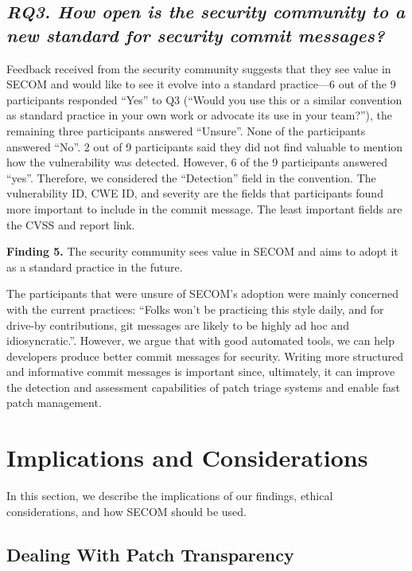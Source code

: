 \subsection*{\textit{RQ3. How open is the security community to a new standard for security commit messages?}}

Feedback received from the security community suggests that they see value in SECOM and would like to see it evolve into a standard practice---6 out of the 9 participants responded ``Yes''
to Q3 (``Would you use this or a similar convention
as standard practice in your own work or advocate its use in your team?''), the remaining three participants answered ``Unsure''. None of the participants answered ``No''. 2 out of 9 participants said they did not find valuable to mention how the vulnerability was detected. However, 6 of the 9 participants answered ``yes''. Therefore, we considered the ``Detection'' field in the convention. The vulnerability ID, CWE ID,  and severity are the fields that participants found more important to include 
in the commit message. The least important fields are the CVSS and report link.

\textbf{Finding 5.} The security community sees value in SECOM and aims to adopt it as a standard practice in the future.

The participants that were unsure of SECOM's adoption were mainly concerned with the current practices: ``Folks won't be practicing this style daily, and for drive-by contributions, git messages are likely to be highly ad hoc and idiosyncratic.''. However, we argue that with good automated tools, we can help developers produce better commit messages for security. Writing more structured and informative commit messages is important since, ultimately, it can improve the detection and assessment capabilities of patch triage systems and enable fast patch management. 











\section{Implications and Considerations}\label{sec:discussion}

In this section, we describe the implications of 
our findings, ethical considerations, and how 
SECOM should be used.

\subsection{Dealing With Patch Transparency}\label{sec:transparency}


